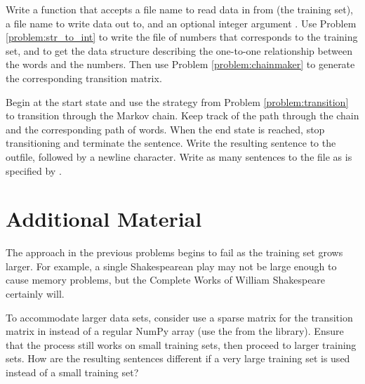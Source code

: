 \begin{problem} %
Write a function that accepts a file name to read data in from (the training set), a file name to write data out to, and an optional integer argument .
Use Problem \ref{problem:str_to_int} to write the file of numbers that corresponds to the training set, and to get the data structure describing the one-to-one relationship between the words and the numbers.
Then use Problem \ref{problem:chainmaker} to generate the corresponding transition matrix.

Begin at the start state and use the strategy from Problem \ref{problem:transition} to transition through the Markov chain.
Keep track of the path through the chain and the corresponding path of words.
When the end state is reached, stop transitioning and terminate the sentence.
Write the resulting sentence to the outfile, followed by a newline character.
Write as many sentences to the file as is specified by .
\end{problem}

\section*{Additional Material} %

The approach in the previous problems begins to fail as the training set grows larger.
For example, a single Shakespearean play may not be large enough to cause memory problems, but the Complete Works of William Shakespeare certainly will.

To accommodate larger data sets, consider use a sparse matrix for the transition matrix in instead of a regular NumPy array (use the  from the  library). %
Ensure that the process still works on small training sets, then proceed to larger training sets.
How are the resulting sentences different if a very large training set is used instead of a small training set?


